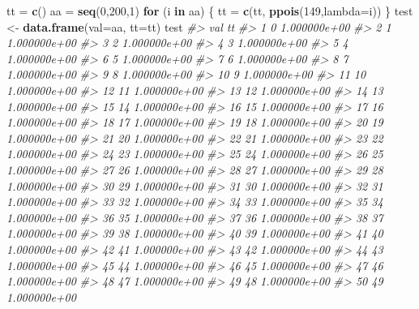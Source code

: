 \documentclass[]{article}
\newenvironment{Shaded}{\begin{snugshade}}{\end{snugshade}}
\newcommand{\CommentTok}[1]{\textcolor[rgb]{0.56,0.35,0.01}{\textit{#1}}}
\newcommand{\ControlFlowTok}[1]{\textcolor[rgb]{0.13,0.29,0.53}{\textbf{#1}}}
\newcommand{\DataTypeTok}[1]{\textcolor[rgb]{0.13,0.29,0.53}{#1}}
\newcommand{\DecValTok}[1]{\textcolor[rgb]{0.00,0.00,0.81}{#1}}
\newcommand{\KeywordTok}[1]{\textcolor[rgb]{0.13,0.29,0.53}{\textbf{#1}}}
\newcommand{\NormalTok}[1]{#1}
\newcommand{\StringTok}[1]{\textcolor[rgb]{0.31,0.60,0.02}{#1}}
\begin{document}
\begin{Shaded}
\begin{Highlighting}[]
\NormalTok{tt =}\StringTok{ }\KeywordTok{c}\NormalTok{()}
\NormalTok{aa =}\StringTok{ }\KeywordTok{seq}\NormalTok{(}\DecValTok{0}\NormalTok{,}\DecValTok{200}\NormalTok{,}\DecValTok{1}\NormalTok{)}
\ControlFlowTok{for}\NormalTok{ (i }\ControlFlowTok{in}\NormalTok{ aa) \{}
\NormalTok{    tt =}\StringTok{ }\KeywordTok{c}\NormalTok{(tt, }\KeywordTok{ppois}\NormalTok{(}\DecValTok{149}\NormalTok{,}\DataTypeTok{lambda=}\NormalTok{i))}
\NormalTok{\}}
\NormalTok{test <-}\StringTok{ }\KeywordTok{data.frame}\NormalTok{(}\DataTypeTok{val=}\NormalTok{aa, }\DataTypeTok{tt=}\NormalTok{tt)}
\NormalTok{test}
\CommentTok{#>     val           tt}
\CommentTok{#> 1     0 1.000000e+00}
\CommentTok{#> 2     1 1.000000e+00}
\CommentTok{#> 3     2 1.000000e+00}
\CommentTok{#> 4     3 1.000000e+00}
\CommentTok{#> 5     4 1.000000e+00}
\CommentTok{#> 6     5 1.000000e+00}
\CommentTok{#> 7     6 1.000000e+00}
\CommentTok{#> 8     7 1.000000e+00}
\CommentTok{#> 9     8 1.000000e+00}
\CommentTok{#> 10    9 1.000000e+00}
\CommentTok{#> 11   10 1.000000e+00}
\CommentTok{#> 12   11 1.000000e+00}
\CommentTok{#> 13   12 1.000000e+00}
\CommentTok{#> 14   13 1.000000e+00}
\CommentTok{#> 15   14 1.000000e+00}
\CommentTok{#> 16   15 1.000000e+00}
\CommentTok{#> 17   16 1.000000e+00}
\CommentTok{#> 18   17 1.000000e+00}
\CommentTok{#> 19   18 1.000000e+00}
\CommentTok{#> 20   19 1.000000e+00}
\CommentTok{#> 21   20 1.000000e+00}
\CommentTok{#> 22   21 1.000000e+00}
\CommentTok{#> 23   22 1.000000e+00}
\CommentTok{#> 24   23 1.000000e+00}
\CommentTok{#> 25   24 1.000000e+00}
\CommentTok{#> 26   25 1.000000e+00}
\CommentTok{#> 27   26 1.000000e+00}
\CommentTok{#> 28   27 1.000000e+00}
\CommentTok{#> 29   28 1.000000e+00}
\CommentTok{#> 30   29 1.000000e+00}
\CommentTok{#> 31   30 1.000000e+00}
\CommentTok{#> 32   31 1.000000e+00}
\CommentTok{#> 33   32 1.000000e+00}
\CommentTok{#> 34   33 1.000000e+00}
\CommentTok{#> 35   34 1.000000e+00}
\CommentTok{#> 36   35 1.000000e+00}
\CommentTok{#> 37   36 1.000000e+00}
\CommentTok{#> 38   37 1.000000e+00}
\CommentTok{#> 39   38 1.000000e+00}
\CommentTok{#> 40   39 1.000000e+00}
\CommentTok{#> 41   40 1.000000e+00}
\CommentTok{#> 42   41 1.000000e+00}
\CommentTok{#> 43   42 1.000000e+00}
\CommentTok{#> 44   43 1.000000e+00}
\CommentTok{#> 45   44 1.000000e+00}
\CommentTok{#> 46   45 1.000000e+00}
\CommentTok{#> 47   46 1.000000e+00}
\CommentTok{#> 48   47 1.000000e+00}
\CommentTok{#> 49   48 1.000000e+00}
\CommentTok{#> 50   49 1.000000e+00}

\end{Highlighting}
\end{Shaded}
\end{document}
